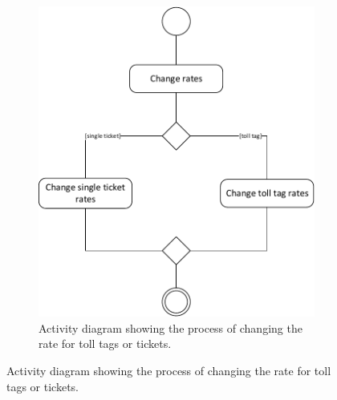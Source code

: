 \begin{figure}[H]
\begin{subfigure}[b]{0.5\textwidth}
	\includegraphics[width=\textwidth]{img/activity_diagrams/Change_rates}
	\caption{Activity diagram showing the process of changing the rate for toll tags or tickets.}
	\end{subfigure}
\end{figure}

